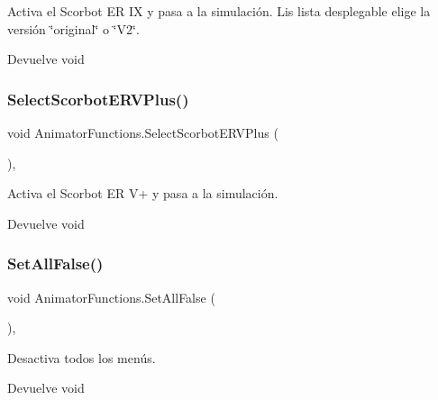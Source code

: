 Activa el Scorbot ER IX y pasa a la simulación. Lis lista desplegable elige la versión \char`\"{}original\char`\"{} o \char`\"{}\+V2\char`\"{}. \begin{DoxyReturn}{Devuelve}
void 
\end{DoxyReturn}
\mbox{\label{class_animator_functions_af181d9e0d15c90193fda9e8766fb820c}} 
\subsubsection{\texorpdfstring{SelectScorbotERVPlus()}{SelectScorbotERVPlus()}}
{\footnotesize\ttfamily void Animator\+Functions.\+Select\+Scorbot\+E\+R\+V\+Plus (\begin{DoxyParamCaption}{ }\end{DoxyParamCaption})\hspace{0.3cm}{\ttfamily [inline]}, {\ttfamily [private]}}

Activa el Scorbot ER V+ y pasa a la simulación. \begin{DoxyReturn}{Devuelve}
void 
\end{DoxyReturn}
\mbox{\label{class_animator_functions_af7c7dc9d64e9329f99a8bef72db57db4}} 
\subsubsection{\texorpdfstring{SetAllFalse()}{SetAllFalse()}}
{\footnotesize\ttfamily void Animator\+Functions.\+Set\+All\+False (\begin{DoxyParamCaption}{ }\end{DoxyParamCaption})\hspace{0.3cm}{\ttfamily [inline]}, {\ttfamily [private]}}

Desactiva todos los menús. \begin{DoxyReturn}{Devuelve}
void 
\end{DoxyReturn}
\mbox{\label{class_animator_functions_aa757bf3b9943de9bac1a5951b5bd151c}} 
